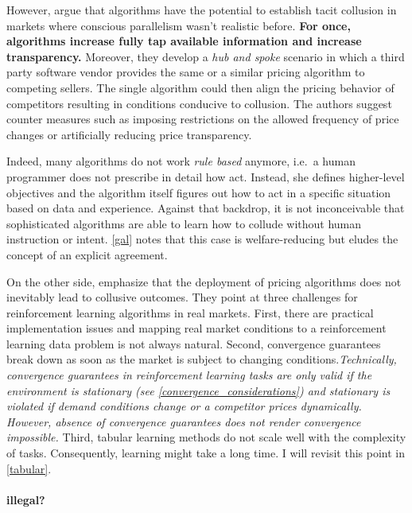 However, \textcite[pp.6-17]{ezrachi_algorithmic_2017} argue that algorithms have the potential to establish tacit collusion in markets where conscious parallelism wasn't realistic before. \textbf{For once, algorithms increase fully tap available information and increase transparency.} Moreover, they develop a \emph{hub and spoke} scenario in which a third party software vendor provides the same or a similar pricing algorithm to competing sellers. The single algorithm could then align the pricing behavior of competitors resulting in conditions conducive to collusion. The authors suggest counter measures such as imposing restrictions on the allowed frequency of price changes or artificially reducing price transparency.


Indeed, many algorithms do not work \emph{rule based} anymore, i.e.\ a human programmer does not prescribe in detail how act. Instead, she defines higher-level objectives and the algorithm itself figures out how to act in a specific situation based on data and experience. Against that backdrop, it is not inconceivable that sophisticated algorithms are able to learn how to collude without human instruction or intent. \autoref{gal} notes that this case is welfare-reducing but eludes the concept of an explicit agreement.

On the other side, \textcite[p.10-13]{ittoo_algorithmic_2017} emphasize that the deployment of pricing algorithms does not inevitably lead to collusive outcomes. They point at three challenges for reinforcement learning algorithms in real markets. First, there are practical implementation issues and mapping real market conditions to a reinforcement learning data problem is not always natural. Second, convergence guarantees break down as soon as the market is subject to changing conditions.\emph{Technically, convergence guarantees in reinforcement learning tasks are only valid if the environment is stationary (see \autoref{convergence_considerations}) and stationary is violated if demand conditions change or a competitor prices dynamically. However, absence of convergence guarantees does not render convergence impossible.} Third, tabular learning methods do not scale well with the complexity of tasks. Consequently, learning might take a long time. I will revisit this point in \autoref{tabular}.

\paragraph{illegal?}

